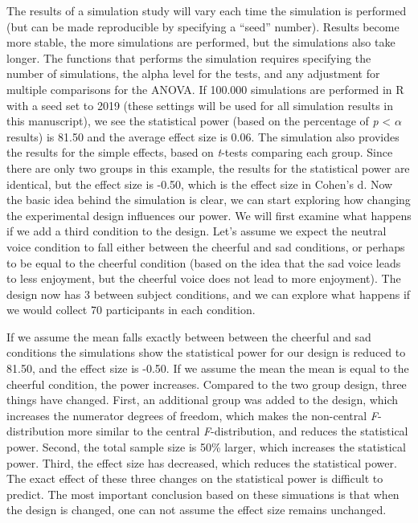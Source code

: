 \documentclass[,man,floatsintext]{apa6}
\begin{document}
The results of a simulation study will vary each time the simulation is
performed (but can be made reproducible by specifying a \enquote{seed}
number). Results become more stable, the more simulations are performed,
but the simulations also take longer. The functions that performs the
simulation requires specifying the number of simulations, the alpha
level for the tests, and any adjustment for multiple comparisons for the
ANOVA. If 100.000 simulations are performed in R with a seed set to 2019
(these settings will be used for all simulation results in this
manuscript), we see the statistical power (based on the percentage of
\emph{p} \textless{} \(\alpha\) results) is 81.50 and the average effect
size is 0.06. The simulation also provides the results for the simple
effects, based on \emph{t}-tests comparing each group. Since there are
only two groups in this example, the results for the statistical power
are identical, but the effect size is -0.50, which is the effect size in
Cohen's d. Now the basic idea behind the simulation is clear, we can
start exploring how changing the experimental design influences our
power. We will first examine what happens if we add a third condition to
the design. Let's assume we expect the neutral voice condition to fall
either between the cheerful and sad conditions, or perhaps to be equal
to the cheerful condition (based on the idea that the sad voice leads to
less enjoyment, but the cheerful voice does not lead to more enjoyment).
The design now has 3 between subject conditions, and we can explore what
happens if we would collect 70 participants in each condition.

If we assume the mean falls exactly between between the cheerful and sad
conditions the simulations show the statistical power for our design is
reduced to 81.50, and the effect size is -0.50. If we assume the mean
the mean is equal to the cheerful condition, the power increases.
Compared to the two group design, three things have changed. First, an
additional group was added to the design, which increases the numerator
degrees of freedom, which makes the non-central \emph{F}-distribution
more similar to the central \emph{F}-distribution, and reduces the
statistical power. Second, the total sample size is 50\% larger, which
increases the statistical power. Third, the effect size has decreased,
which reduces the statistical power. The exact effect of these three
changes on the statistical power is difficult to predict. The most
important conclusion based on these simuations is that when the design
is changed, one can not assume the effect size remains unchanged.
\end{document}
